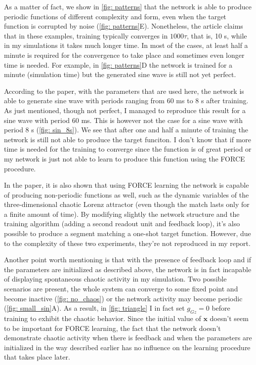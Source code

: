 As a matter of fact, we show in \autoref{fig: patterns} that the network
is able to produce periodic functions of different complexity and form, 
even when the target function is corrupted by noise 
(\autoref{fig: patterns}E). Nonetheless, the article claims that in these
examples, training typically converges in $1000\tau$, that is, 10 s, while
in my simulations it takes much longer time. In most of the cases,
at least half a minute is required for the convergence to take place and 
sometimes even longer time is needed. For example, in 
\autoref{fig: patterns}D the network is trained for a minute 
(simulation time) but the generated sine wave is still not yet perfect.

According to the paper, with the parameters that are used here,
the network is able to generate sine wave with periods ranging from 60 ms
to 8 s after training. As just mentioned, though not perfect, I managed
to reproduce this result for a sine wave with period 60 ms. This is
however not the case for a sine wave with period 8 s 
(\autoref{fig: sin_8s}). We see that after one and half a minute of training
the network is still not able to produce the target funciton.
I don't know that if more time is needed for the training to converge 
since the function is of great period or my network is just not able to
learn to produce this function using the FORCE procedure.

In the paper, it is also shown that using FORCE learning the network is
capable of producing non-periodic functions as well, such as the dynamic 
variables of the three-dimensional chaotic Lorenz attractor (even though the
match lasts only for a finite amount of time). By modifying slightly 
the network structure and the training algorithm (adding a second readout
unit and feedback loop), it's also possible to produce a segment matching
a one-shot target function. However, due to the complexity of these two
experiments, they're not reproduced in my report.

Another point worth mentioning is that with the presence of feedback loop
and if the parameters are initialized as described above, the network is in
fact incapable of displaying spontaneous chaotic activity in my simulation.
Two possible scenarios are present, the whole system can converge
to some fixed point and become inactive (\autoref{fig: no_chaos}) or 
the network activity may become periodic (\autoref{fig: small_sin}A).
As a result, in \autoref{fig: triangle} I in fact set $g_{Gz}=0$
before training to exhibit the chaotic behavior. Since the initial value
of $\mathbf{x}$ doesn't seem to be important for FORCE learning, the fact
that the network doesn't demonstrate chaotic activity when there is 
feedback and when the parameters are initialized in the way described earlier
has no influence on the learning procedure that takes place later. 


